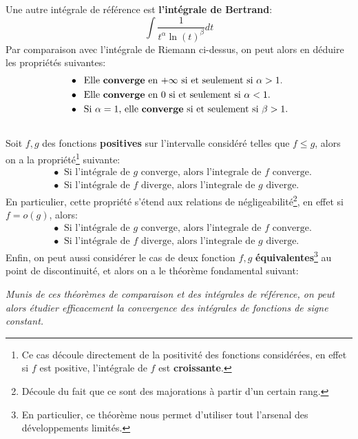 Une autre intégrale de référence est \textbf{l'intégrale de Bertrand}:
\[
   \int \frac{1}{t^\alpha \ln(t)^\beta} d t   
\]
Par comparaison avec l'intégrale de Riemann ci-dessus, on peut alors en déduire les propriétés suivantes:
\begin{align*}
   &\bullet \;\; \text{Elle \textbf{converge} en \(+\infty\) si et seulement si \(\alpha > 1\).} \\
   &\bullet \;\; \text{Elle \textbf{converge} en \(0\) si et seulement si \(\alpha < 1\).} \\
   &\bullet \;\; \text{Si \(\alpha = 1\), elle \textbf{converge} si et seulement si \(\beta > 1\).}
\end{align*}
\subsection*{}
Soit \(f, g\) des fonctions \textbf{positives} sur l'intervalle considéré telles que \(f \leq g\), alors on a la propriété\footnote[1]{Ce cas découle directement de la positivité des fonctions considérées, en effet si \(f\) est positive, l'intégrale de \(f\) est \textbf{croissante}.} suivante:
\begin{align*}
   &\bullet \;\; \text{Si l'intégrale de \(g\) converge, alors l'integrale de \(f\) converge.} \\
   &\bullet \;\; \text{Si l'intégrale de \(f\) diverge, alors l'integrale de \(g\) diverge.}
\end{align*}
En particulier, cette propriété s'étend aux relations de négligeabilité\footnote[2]{Découle du fait que ce sont des majorations à partir d'un certain rang.}, en effet si \(f = o(g)\), alors:
\begin{align*}
   &\bullet \;\; \text{Si l'intégrale de \(g\) converge, alors l'integrale de \(f\) converge.} \\
   &\bullet \;\; \text{Si l'intégrale de \(f\) diverge, alors l'integrale de \(g\) diverge.}
\end{align*}
Enfin, on peut aussi considérer le cas de deux fonction \(f, g\) \textbf{équivalentes}\footnote[3]{En particulier, ce théorème nous permet d'utiliser tout l'arsenal des développements limités.} au point de discontinuité, et alors on a le théorème fondamental suivant:
\begin{center}
   \textit{Munis de ces théorèmes de comparaison et des intégrales de référence, on peut alors étudier efficacement la convergence des intégrales de fonctions de signe constant.}
\end{center}
